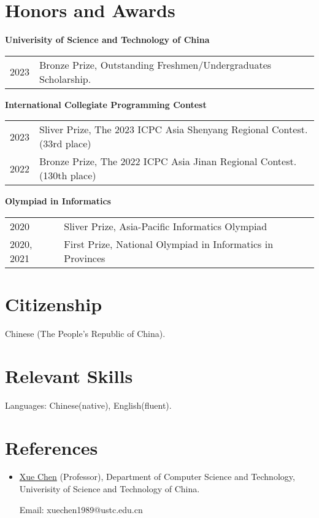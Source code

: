 \documentclass[12pt,a4paper,oneside]{ctexart}
\begin{document}
\section*{Honors and Awards}

\textbf{Univerisity of Science and Technology of China}

\begin{tabular}{ll}
    2023 & Bronze Prize, Outstanding Freshmen/Undergraduates Scholarship.
\end{tabular}

\vspace{0.5cm}

\textbf{International Collegiate Programming Contest}

\begin{tabular}{ll}
    2023 & Sliver Prize, The 2023 ICPC Asia Shenyang Regional Contest. (33rd place) \\
    2022 & Bronze Prize, The 2022 ICPC Asia Jinan Regional Contest. (130th place)
\end{tabular}

\vspace{0.5cm}

\textbf{Olympiad in Informatics}

\begin{tabular}{ll}
    2020 & Sliver Prize, Asia-Pacific Informatics Olympiad \\
    2020, 2021 & First Prize, National Olympiad in Informatics in Provinces
\end{tabular}

\section*{Citizenship}

Chinese (The People's Republic of China).

\section*{Relevant Skills}

Languages: Chinese(native), English(fluent).

\section*{References}

\begin{itemize}
    \item \href{http://staff.ustc.edu.cn/~xuechen1989/}{Xue Chen} (Professor), Department of Computer Science and Technology, Univerisity of Science and Technology of China.
    
          Email: xuechen1989@ustc.edu.cn
\end{itemize}
\end{document}
